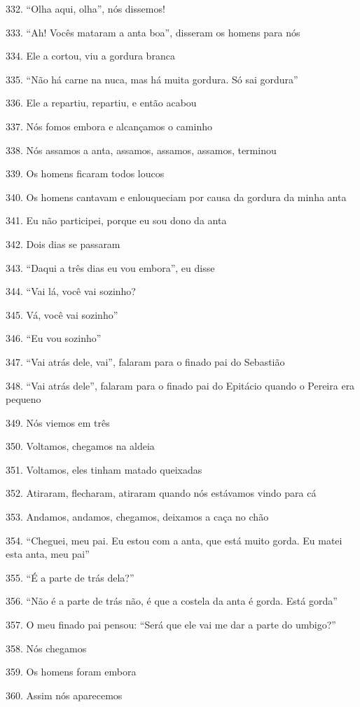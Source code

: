 332. ``Olha aqui, olha'', nós dissemos!

333. ``Ah! Vocês mataram a anta boa'', disseram os homens para nós

334. Ele a cortou, viu a gordura branca

335. ``Não há carne na nuca, mas há muita gordura. Só sai gordura''

336. Ele a repartiu, repartiu, e então acabou

337. Nós fomos embora e alcançamos o caminho

338. Nós assamos a anta, assamos, assamos, assamos, terminou

339. Os homens ficaram todos loucos

340. Os homens cantavam e enlouqueciam por causa da gordura da minha anta

341. Eu não participei, porque eu sou dono da anta

342. Dois dias se passaram

343. ``Daqui a três dias eu vou embora'', eu disse

344. ``Vai lá, você vai sozinho?

345. Vá, você vai sozinho''

346. ``Eu vou sozinho''

347. ``Vai atrás dele, vai'', falaram para o finado pai do Sebastião

348. ``Vai atrás dele'', falaram para o finado pai do Epitácio quando o
Pereira era pequeno

349. Nós viemos em três

350. Voltamos, chegamos na aldeia

351. Voltamos, eles tinham matado queixadas

352. Atiraram, flecharam, atiraram quando nós estávamos vindo para cá

353. Andamos, andamos, chegamos, deixamos a caça no chão

354. ``Cheguei, meu pai. Eu estou com a anta, que está muito gorda. Eu matei esta anta, meu pai''

355. ``É a parte de trás dela?''

356. ``Não é a parte de trás não, é que a costela da anta é gorda. Está gorda''

357. O meu finado pai pensou: ``Será que ele vai me dar a parte do umbigo?''

358. Nós chegamos

359. Os homens foram embora

360. Assim nós aparecemos

